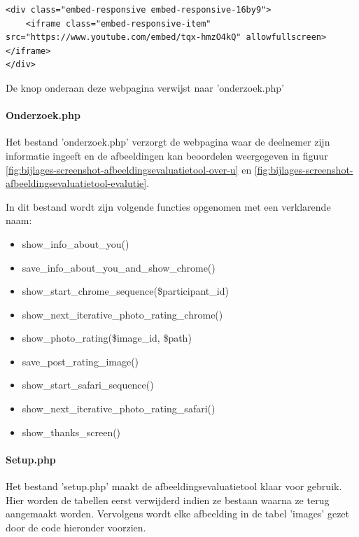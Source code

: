 \begin{lstlisting}[style=htmlcssjs]
<div class="embed-responsive embed-responsive-16by9">
	<iframe class="embed-responsive-item" src="https://www.youtube.com/embed/tqx-hmzO4kQ" allowfullscreen></iframe>
</div>
\end{lstlisting}

De knop onderaan deze webpagina verwijst naar 'onderzoek.php'

\paragraph{Onderzoek.php}
\label{sec:onderzoek-evaluatietool-setup-onderzoek}

Het bestand 'onderzoek.php' verzorgt de webpagina waar de deelnemer zijn informatie ingeeft en de afbeeldingen kan beoordelen weergegeven in figuur \ref{fig:bijlages-screenshot-afbeeldingsevaluatietool-over-u} en \ref{fig:bijlages-screenshot-afbeeldingsevaluatietool-evalutie}.  

In dit bestand wordt zijn volgende functies opgenomen met een verklarende naam:

\begin{itemize}
	\item show\_info\_about\_you()
	\item save\_info\_about\_you\_and\_show\_chrome()
	\item show\_start\_chrome\_sequence(\$participant\_id)
	\item show\_next\_iterative\_photo\_rating\_chrome()
	\item show\_photo\_rating(\$image\_id, \$path)
	\item save\_post\_rating\_image()
	\item show\_start\_safari\_sequence()
	\item show\_next\_iterative\_photo\_rating\_safari()
	\item show\_thanks\_screen()
\end{itemize}

\paragraph{Setup.php}
\label{sec:onderzoek-evaluatietool-setup-setup}

Het bestand 'setup.php' maakt de \gls{afbeeldingsevaluatietool} klaar voor gebruik. Hier worden de tabellen eerst verwijderd indien ze bestaan waarna ze terug aangemaakt worden. Vervolgens wordt elke afbeelding in de tabel 'images' gezet door de code hieronder voorzien.


